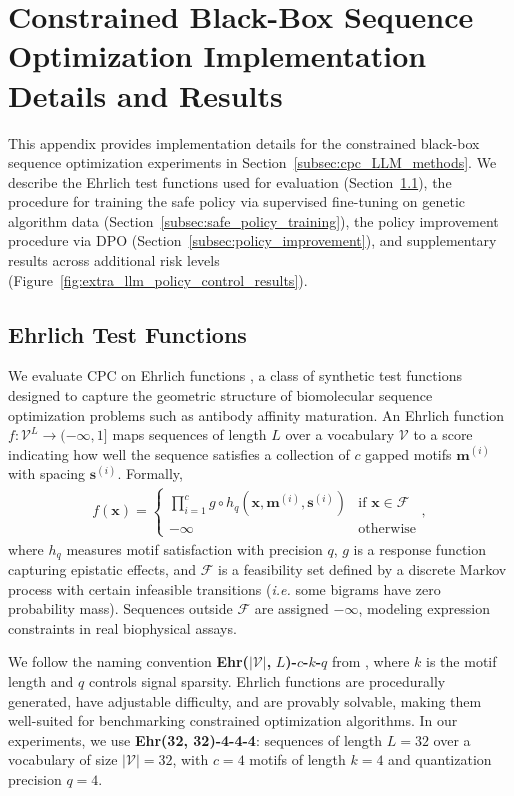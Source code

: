 \section{Constrained Black-Box Sequence Optimization Implementation Details and Results}
\label{app:sequence_opt}

This appendix provides implementation details for the constrained black-box sequence optimization experiments in Section~\ref{subsec:cpc_LLM_methods}. We describe the Ehrlich test functions used for evaluation (Section~\ref{subsec:ehrlich}), the procedure for training the safe policy via supervised fine-tuning on genetic algorithm data (Section~\ref{subsec:safe_policy_training}), the policy improvement procedure via DPO (Section~\ref{subsec:policy_improvement}), and supplementary results across additional risk levels (Figure~\ref{fig:extra_llm_policy_control_results}).

\subsection{Ehrlich Test Functions}
\label{subsec:ehrlich}

We evaluate CPC on Ehrlich functions \citep{chen2025generalists}, a class of synthetic test functions designed to capture the geometric structure of biomolecular sequence optimization problems such as antibody affinity maturation. An Ehrlich function $f: \mathcal{V}^L \rightarrow (-\infty, 1]$ maps sequences of length $L$ over a vocabulary $\mathcal{V}$ to a score indicating how well the sequence satisfies a collection of $c$ gapped motifs $\mathbf m^{(i)}$ with spacing $\mathbf s^{(i)}$. Formally,
\begin{align}
    f(\mathbf{x}) = \begin{cases}
        \prod_{i=1}^c g \circ h_q(\mathbf{x}, \mathbf{m}^{(i)}, \mathbf{s}^{(i)}) & \text{if } \mathbf{x} \in \mathcal{F} \\
        -\infty & \text{otherwise}
    \end{cases},
\end{align}
where $h_q$ measures motif satisfaction with precision $q$, $g$ is a response function capturing epistatic effects, and $\mathcal{F}$ is a feasibility set defined by a discrete Markov process with certain infeasible transitions (\textit{i.e.} some bigrams have zero probability mass). Sequences outside $\mathcal{F}$ are assigned $-\infty$, modeling expression constraints in real biophysical assays.

We follow the naming convention \textbf{Ehr(}$|\mathcal{V}|$\textbf{,} $L$\textbf{)-}$c$\textbf{-}$k$\textbf{-}$q$ from \citet{chen2025generalists}, where $k$ is the motif length and $q$ controls signal sparsity. Ehrlich functions are procedurally generated, have adjustable difficulty, and are provably solvable, making them well-suited for benchmarking constrained optimization algorithms. In our experiments, we use \textbf{Ehr(32, 32)-4-4-4}: sequences of length $L=32$ over a vocabulary of size $|\mathcal{V}|=32$, with $c=4$ motifs of length $k=4$ and quantization precision $q=4$.

